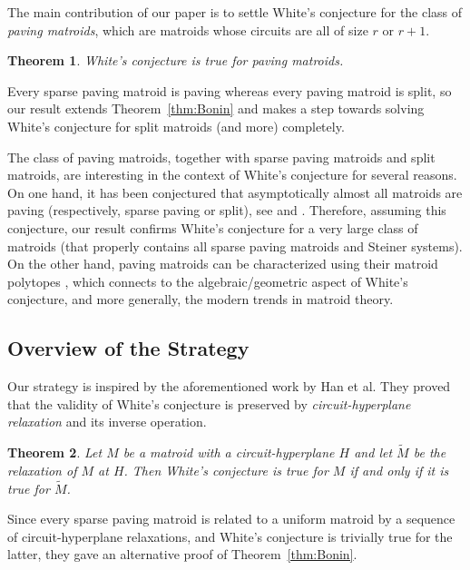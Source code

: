 \documentclass{amsart}
\newtheorem{theorem}{Theorem}[section]
\begin{document}
The main contribution of our paper is to settle White's conjecture for the class of {\em paving matroids}, which are matroids whose circuits are all of size $r$ or $r+1$.

\begin{theorem} \label{thm:A}
    White's conjecture is true for paving matroids.
\end{theorem}

Every sparse paving matroid is paving whereas every paving matroid is split, so our result extends Theorem~\ref{thm:Bonin} and makes a step towards solving White's conjecture for split matroids (and more) completely.

The class of paving matroids, together with sparse paving matroids and split matroids, are interesting in the context of White's conjecture for several reasons. On one hand, it has been conjectured that asymptotically almost all matroids are paving (respectively, sparse paving or split), see \cite[Conjecture~1.6]{MNWW2011} and \cite[Conjecture~15.5.8]{Oxley}. Therefore, assuming this conjecture, our result confirms White's conjecture for a very large class of matroids (that properly contains all sparse paving matroids and Steiner systems). On the other hand, paving matroids can be characterized using their matroid polytopes \cite{Joswig2017}, which connects to the algebraic/geometric aspect of White's conjecture, and more generally, the modern trends in matroid theory.

\subsection{Overview of the Strategy}

Our strategy is inspired by the aforementioned work by Han et al. They proved that the validity of White's conjecture is preserved by {\em circuit-hyperplane relaxation} and its inverse operation.

\begin{theorem} \cite{han2025white}
    Let $M$ be a matroid with a circuit-hyperplane $H$ and let $\widetilde{M}$ be the relaxation of $M$ at $H$. Then White's conjecture is true for $M$ if and only if it is true for $\widetilde{M}$.
\end{theorem}

Since every sparse paving matroid is related to a uniform matroid by a sequence of circuit-hyperplane relaxations, and White's conjecture is trivially true for the latter, they gave an alternative proof of Theorem~\ref{thm:Bonin}.
\end{document}
